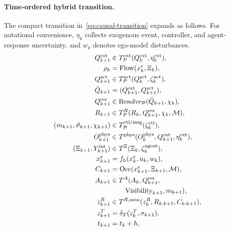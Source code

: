 \documentclass[letterpaper]{article} %
\begin{document}
\paragraph{Time-ordered hybrid transition.}
The compact transition in~\eqref{eq:causal-transition} expands as follows. For notational convenience, $\eta_k$ collects exogenous event, controller, and agent-response uncertainty, and $w_k$ denotes ego-model disturbances.
\begin{align}
Q_{k+1}^{\rm ext}&\in T_{\mathcal P}^{\rm ext}(Q_k^{\rm ext},\eta_k^{\rm ext}),\nonumber\\
\rho_k&=\operatorname{Flow}(x_k^e,\Xi_k),\nonumber\\
Q_{k+1}^{\rm act}&\in T_{\mathcal P}^{\rm act}(Q_k^{\rm act},\zeta_k^{\rm act}),\nonumber\\
\bar Q_{k+1}&=(Q_{k+1}^{\rm ext},Q_{k+1}^{\rm act}),\nonumber\\
Q_{k+1}^{\rm res}&\in\operatorname{Resolve}_{\mathcal P}(\bar Q_{k+1},\chi_k),\nonumber\\
R_{k+1}&\in T_{\mathcal P}^{R}(R_k,Q_{k+1}^{\rm res},\chi_k,\mathcal M),\nonumber\\
(m_{k+1},\vartheta_{k+1},\chi_{k+1})&
 \in T_{\mathcal P}^{\rm ctl/msg}(\zeta_k^{\rm ctl}),\nonumber\\
O_{k+1}^{\rm phys}&\in T^{\rm phys}(O_k^{\rm phys},Q_{k+1}^{\rm ext},\eta_k^{\rm ext}),\nonumber\\
(\Xi_{k+1},Y_{k+1}^{\rm int})&
 \in T^{\Xi}(\Xi_k,\zeta_k^{\rm agent}),\nonumber\\
x_{k+1}^e&=f_h(x_k^e,u_k,w_k),\nonumber\\
C_{k+1}&=\operatorname{Occ}(x_{k+1}^e,\Xi_{k+1},\mathcal M),\nonumber\\
A_{k+1}&\in T^{A}(A_k,Q_{k+1}^{\rm res},\nonumber\\
&\qquad \operatorname{Visibility}_{k+1},m_{k+1}),\nonumber\\
z_{k+1}^{R}&\in T^{R,\rm mon}(z_k^R,R_{k:k+1},C_{k:k+1}),\nonumber\\
z_{k+1}^{T}&=\delta_T(z_k^T,\sigma_{k+1}),\nonumber\\
t_{k+1}&=t_k+h,
\label{eq:causal-transition-expanded}
\end{align}
\end{document}
